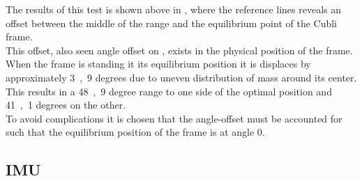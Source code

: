 \begin{minipage}{\linewidth}
\begin{minipage}{0.45\linewidth}
\begin{figure}[H]
  			\centering
  			\captionsetup{justification=centering}
  			\vspace{-.5cm}
  			\label{PotentiometerResolutionRadDeg}
  		\end{figure}\vspace{-5mm}
  	\end{minipage}
\end{minipage}

The results of this test is shown above in , where the reference lines reveals an offset between the middle of the range and the equilibrium point of the Cubli frame.\\
This offset, also seen angle offset on , exists in the physical position of the frame. When the frame is standing it its equilibrium position it is displaces by approximately \si{3,9} degrees due to uneven distribution of mass around its center.\\
This results in a \si{48,9} degree range to one side of the optimal position and \si{41,1} degrees on the other.\\
To avoid complications it is chosen that the angle-offset must be accounted for such that the equilibrium position of the frame is at angle 0.


\subsection{IMU}
